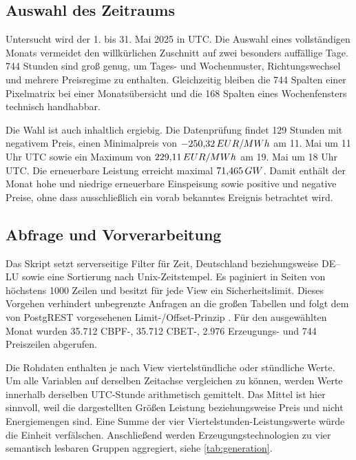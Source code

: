 \subsection*{Auswahl des Zeitraums}

Untersucht wird der 1. bis 31. Mai 2025 in UTC. Die Auswahl eines vollständigen
Monats vermeidet den willkürlichen Zuschnitt auf zwei besonders auffällige
Tage. 744 Stunden sind gro{\ss} genug, um Tages- und Wochenmuster, Richtungswechsel
und mehrere Preisregime zu enthalten. Gleichzeitig bleiben die 744 Spalten
einer Pixelmatrix bei einer Monatsübersicht und die 168 Spalten eines
Wochenfensters technisch handhabbar.

Die Wahl ist auch inhaltlich ergiebig. Die Datenprüfung findet 129 Stunden mit
negativem Preis, einen Minimalpreis von \(-250{,}32\,EUR/MWh\) am 11. Mai um
11 Uhr UTC sowie ein Maximum von \(229{,}11\,EUR/MWh\) am 19. Mai um 18 Uhr UTC.
Die erneuerbare Leistung erreicht maximal \(71{,}465\,GW\). Damit enthält der
Monat hohe und niedrige erneuerbare Einspeisung sowie positive und negative
Preise, ohne dass ausschlie{\ss}lich ein vorab bekanntes Ereignis betrachtet wird.

\subsection*{Abfrage und Vorverarbeitung}

Das Skript  setzt serverseitige
Filter für Zeit, Deutschland beziehungsweise DE--LU sowie eine Sortierung nach
Unix-Zeitstempel. Es paginiert in Seiten von höchstens 1000 Zeilen und besitzt
für jede View ein Sicherheitslimit. Dieses Vorgehen verhindert unbegrenzte
Anfragen an die gro{\ss}en Tabellen und folgt dem von PostgREST vorgesehenen
Limit-/Offset-Prinzip \cite{postgrestPagination}. Für den ausgewählten Monat
wurden 35.712 CBPF-, 35.712 CBET-, 2.976 Erzeugungs- und 744 Preiszeilen
abgerufen.

Die Rohdaten enthalten je nach View viertelstündliche oder stündliche Werte.
Um alle Variablen auf derselben Zeitachse vergleichen zu können, werden Werte
innerhalb derselben UTC-Stunde arithmetisch gemittelt. Das Mittel ist hier
sinnvoll, weil die dargestellten Grö{\ss}en Leistung beziehungsweise Preis und
nicht Energiemengen sind. Eine Summe der vier Viertelstunden-Leistungswerte
würde die Einheit verfälschen. Anschlie{\ss}end werden Erzeugungstechnologien zu
vier semantisch lesbaren Gruppen aggregiert, siehe \cref{tab:generation}.

